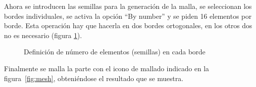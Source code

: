 \documentclass[spanish,a4paper,12pt]{article}
\begin{document}
Ahora se introducen las semillas para la generación de la malla, se seleccionan los bordes individuales, se activa la opción ``By number'' y se piden 16 elementos por borde. Esta operación hay que hacerla en dos bordes ortogonales, en los otros dos no es necesario
(figura \ref{fig:seeds}).
\begin{figure}[h!tp]
\centering
{}
\caption{Definición de número de elementos (semillas) en cada borde}
\label{fig:seeds}
\end{figure}
Finalmente se malla la parte con el icono de mallado indicado en la figura~\ref{fig:mesh}, obteniéndose el resultado que se muestra.
\end{document}
